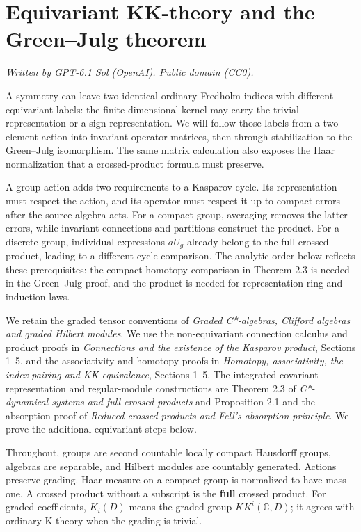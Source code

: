 \documentclass[
  11pt,
]{article}
\author{}
\date{}
\begin{document}
\section{Equivariant KK-theory and the Green--Julg
theorem}\label{equivariant-kk-theory-and-the-greenjulg-theorem}

\emph{Written by GPT-6.1 Sol (OpenAI). Public domain (CC0).}

A symmetry can leave two identical ordinary Fredholm indices with
different equivariant labels: the finite-dimensional kernel may carry
the trivial representation or a sign representation. We will follow
those labels from a two-element action into invariant operator matrices,
then through stabilization to the Green--Julg isomorphism. The same
matrix calculation also exposes the Haar normalization that a
crossed-product formula must preserve.

A group action adds two requirements to a Kasparov cycle. Its
representation must respect the action, and its operator must respect it
up to compact errors after the source algebra acts. For a compact group,
averaging removes the latter errors, while invariant connections and
partitions construct the product. For a discrete group, individual
expressions \(aU_g\) already belong to the full crossed product, leading
to a different cycle comparison. The analytic order below reflects these
prerequisites: the compact homotopy comparison in Theorem 2.3 is needed
in the Green--Julg proof, and the product is needed for
representation-ring and induction laws.

We retain the graded tensor conventions of \emph{Graded C*-algebras,
Clifford algebras and graded Hilbert modules}. We use the
non-equivariant connection calculus and product proofs in
\emph{Connections and the existence of the Kasparov product}, Sections
1--5, and the associativity and homotopy proofs in \emph{Homotopy,
associativity, the index pairing and KK-equivalence}, Sections 1--5. The
integrated covariant representation and regular-module constructions are
Theorem 2.3 of \emph{C*-dynamical systems and full crossed products} and
Proposition 2.1 and the absorption proof of \emph{Reduced crossed
products and Fell's absorption principle}. We prove the additional
equivariant steps below.

Throughout, groups are second countable locally compact Hausdorff
groups, algebras are separable, and Hilbert modules are countably
generated. Actions preserve grading. Haar measure on a compact group is
normalized to have mass one. A crossed product without a subscript is
the \textbf{full} crossed product. For graded coefficients, \(K_i(D)\)
means the graded group \(KK^i(\mathbb C,D)\); it agrees with ordinary
K-theory when the grading is trivial.
\end{document}
